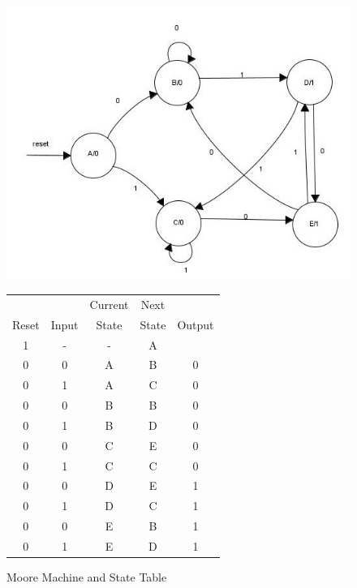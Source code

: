 \documentclass{article}
\begin{document}
\begin{figure}[H]
	\begin{minipage}[t]{0.48\linewidth}
		\vspace{0pt}
		\centering
		\includegraphics[scale = 1.5]{berkley-moore.jpg}
	\end{minipage}
	\begin{minipage}[t]{0.48\linewidth}
		\vspace{0pt}
		\begin{tabular}{c c c | c c} 
			& & Current & Next & \\
			Reset & Input & State & State & Output \\
			\hline
			1 & - & - & A & \\
			0 & 0 & A & B & 0 \\
			0 & 1 & A & C & 0 \\
			0 & 0 & B & B & 0 \\
			0 & 1 & B & D & 0 \\
			0 & 0 & C & E & 0 \\
			0 & 1 & C & C & 0 \\
			0 & 0 & D & E & 1 \\
			0 & 1 & D & C & 1 \\
			0 & 0 & E & B & 1 \\
			0 & 1 & E & D & 1 \\
		\end {tabular}
	\end{minipage}
	\label{fsm:berkley-moore}
	\caption{Moore Machine and State Table}
\end{figure}
\newpage
\end{document}
